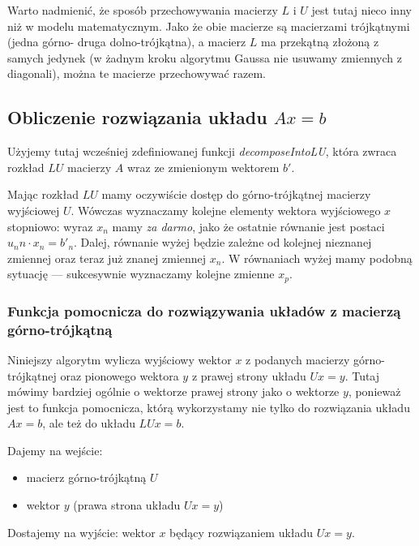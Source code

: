 \documentclass[10pt]{article}
\begin{document}
Warto nadmienić, że sposób przechowywania macierzy $L$ i $U$ jest tutaj nieco inny niż w modelu matematycznym. Jako że obie macierze są macierzami trójkątnymi (jedna górno- druga dolno-trójkątna), a macierz $L$ ma przekątną złożoną z samych jedynek (w żadnym kroku algorytmu Gaussa nie usuwamy zmiennych z diagonali), można te macierze przechowywać razem.

\subsection{Obliczenie rozwiązania układu $Ax = b$}

Użyjemy tutaj wcześniej zdefiniowanej funkcji \textit{decomposeIntoLU}, która zwraca rozkład $LU$ macierzy $A$ wraz ze zmienionym wektorem $b'$.

Mając rozkład $LU$ mamy oczywiście dostęp do górno-trójkątnej macierzy wyjściowej $U$. Wówczas wyznaczamy kolejne elementy wektora wyjściowego $x$ stopniowo: wyraz $x_n$ mamy \textit{za darmo}, jako że ostatnie równanie jest postaci $u_nn \cdot x_n = b'_n$. Dalej, równanie wyżej będzie zależne od kolejnej nieznanej zmiennej oraz teraz już znanej zmiennej $x_n$. W równaniach wyżej mamy podobną sytuację — sukcesywnie wyznaczamy kolejne zmienne $x_p$.

\subsubsection{Funkcja pomocnicza do rozwiązywania układów z macierzą górno-trójkątną}
\label{sec:solveUpperTriangularMatrix}

Niniejszy algorytm wylicza wyjściowy wektor $x$ z podanych macierzy górno-trójkątnej oraz pionowego wektora $y$ z prawej strony układu $Ux = y$. Tutaj mówimy bardziej ogólnie o wektorze prawej strony jako o wektorze $y$, ponieważ jest to funkcja pomocnicza, którą wykorzystamy nie tylko do rozwiązania układu $Ax = b$, ale też do układu $LUx = b$.

\noindent Dajemy na wejście:
\begin{itemize}
    \item macierz górno-trójkątną $U$
    \item wektor $y$ (prawa strona układu $Ux = y$)
\end{itemize}

\noindent Dostajemy na wyjście: wektor $x$ będący rozwiązaniem układu $Ux = y$.
\end{document}
